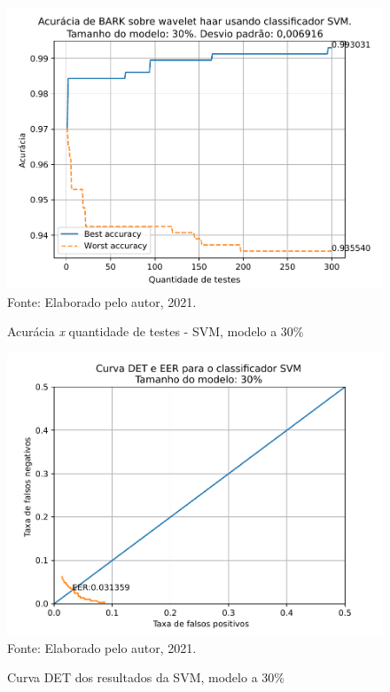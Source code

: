 			\begin{figure}[H]
				\centering
				\caption{Acurácia \textit{x} quantidade de testes - SVM, modelo a 30\%}
				\includegraphics[width=.9\linewidth]{images/results/confusionMatrices/classifier_SVM_30}
				\label{fig:classifiersvm30}
				\\Fonte: Elaborado pelo autor, 2021.
			\end{figure}
		
			\begin{figure}[H]
				\centering
				\caption{Curva DET dos resultados da SVM, modelo a 30\%}
				\includegraphics[width=.9\linewidth]{images/results/det/DET_for_classifier_SVM_30}
				\label{fig:detsvm30}
				\\Fonte: Elaborado pelo autor, 2021.
			\end{figure}
			
